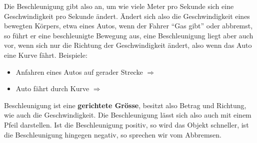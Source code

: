 Die Beschleunigung gibt also an, um wie viele Meter pro Sekunde sich eine Geschwindigkeit pro Sekunde ändert.
Ändert sich also die Geschwindigkeit eines bewegten Körpers, etwa eines Autos, wenn der Fahrer ``Gas gibt'' oder abbremst, so führt er eine beschleunigte Bewegung aus, eine Beschleunigung liegt aber auch vor, wenn sich nur die Richtung der Geschwindigkeit ändert, also wenn das Auto eine Kurve fährt. Beispiele:
\begin{example}
\begin{itemize}
	\item Anfahren eines Autos auf gerader Strecke $\Rightarrow$ 
	\item Auto fährt durch Kurve $\Rightarrow$ 
\end{itemize}
\end{example}
Beschleunigung ist eine \textbf{gerichtete Grösse}, besitzt also Betrag und Richtung, wie auch die Geschwindigkeit. Die Beschleunigung lässt sich also auch mit einem Pfeil darstellen. Ist die Beschleunigung positiv, so wird das Objekt schneller, ist die Beschleunigung hingegen negativ, so sprechen wir vom Abbremsen.

